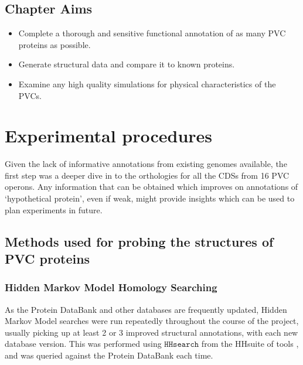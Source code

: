 \subsection*{Chapter Aims}

\begin{itemize}
	\item Complete a thorough and sensitive functional annotation of as many PVC proteins as possible.
	\item Generate structural data and compare it to known proteins.
	\item Examine any high quality simulations for physical characteristics of the PVCs.

\end{itemize}

\clearpage

\section{Experimental procedures}
Given the lack of informative annotations from existing genomes available, the first step was a deeper dive in to the orthologies for all the CDSs from 16 PVC operons. Any information that can be obtained which improves on annotations of `hypothetical protein', even if weak, might provide insights which can be used to plan experiments in future.
	 

\subsection{Methods used for probing the structures of PVC proteins}
\subsubsection{Hidden Markov Model Homology Searching}\label{hhresults}
As the Protein DataBank and other databases are frequently updated, Hidden Markov Model searches were run repeatedly throughout the course of the project, usually picking up at least 2 or 3 improved structural annotations, with each new database version. This was performed using $\mathtt{HHsearch}$ from the HHsuite of tools \citep{Remmert2012}, and was queried against the Protein DataBank each time.
	
